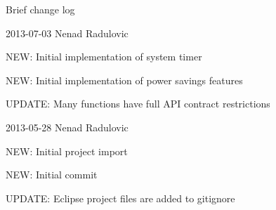 Brief change log

2013-\/07-\/03 Nenad Radulovic


\begin{DoxyItemize}
\item {\ttfamily N\-E\-W\-:} Initial implementation of system timer
\item {\ttfamily N\-E\-W\-:} Initial implementation of power savings features
\item {\ttfamily U\-P\-D\-A\-T\-E\-:} Many functions have full A\-P\-I contract restrictions
\end{DoxyItemize}

2013-\/05-\/28 Nenad Radulovic


\begin{DoxyItemize}
\item {\ttfamily N\-E\-W\-:} Initial project import
\item {\ttfamily N\-E\-W\-:} Initial commit
\item {\ttfamily U\-P\-D\-A\-T\-E\-:} Eclipse project files are added to gitignore 
\end{DoxyItemize}